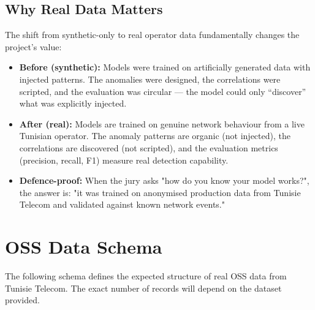 \subsection{Why Real Data Matters}

The shift from synthetic-only to real operator data fundamentally changes the project's value:

\begin{itemize}
  \item \textbf{Before (synthetic):} Models were trained on artificially generated data with injected patterns. The anomalies were designed, the correlations were scripted, and the evaluation was circular --- the model could only ``discover'' what was explicitly injected.
  
  \item \textbf{After (real):} Models are trained on genuine network behaviour from a live Tunisian operator. The anomaly patterns are organic (not injected), the correlations are discovered (not scripted), and the evaluation metrics (precision, recall, F1) measure real detection capability.
  
  \item \textbf{Defence-proof:} When the jury asks "how do you know your model works?", the answer is: "it was trained on anonymised production data from Tunisie Telecom and validated against known network events."
\end{itemize}

\section{OSS Data Schema}

The following schema defines the expected structure of real OSS data from Tunisie Telecom. The exact number of records will depend on the dataset provided.

